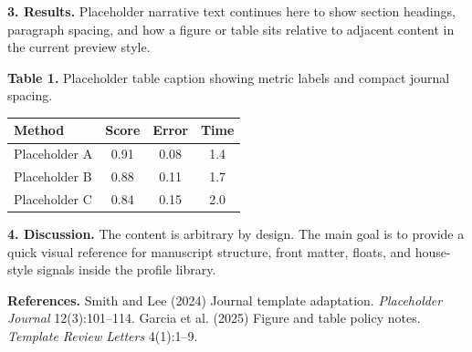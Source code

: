 \documentclass[10pt,a4paper]{article}
\begin{document}
\textbf{3. Results.} Placeholder narrative text continues here to show section headings, paragraph spacing, and how a figure or table sits relative to adjacent content in the current preview style.

\noindent\textbf{Table 1.} Placeholder table caption showing metric labels and compact journal spacing.\par\begin{center}
\begin{tabular}{lccc}
\toprule
Method & Score & Error & Time\\
\midrule
Placeholder A & 0.91 & 0.08 & 1.4\\
Placeholder B & 0.88 & 0.11 & 1.7\\
Placeholder C & 0.84 & 0.15 & 2.0\\
\bottomrule
\end{tabular}\end{center}\vspace{0.5em}

\textbf{4. Discussion.} The content is arbitrary by design. The main goal is to provide a quick visual reference for manuscript structure, front matter, floats, and house-style signals inside the profile library.



\vspace{0.5em}
\noindent \textbf{References.} Smith and Lee (2024) Journal template adaptation. \textit{Placeholder Journal} 12(3):101--114. Garcia et al. (2025) Figure and table policy notes. \textit{Template Review Letters} 4(1):1--9.\par
\vspace{0.6em}
\end{document}
